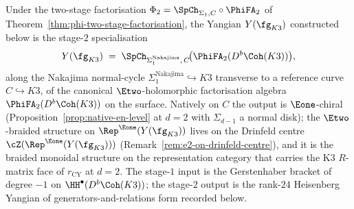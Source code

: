 \begin{remark}
\label{rem:k3y-stage-abelian-yangian}
Under the two-stage factorisation
$\Phi_2 = \SpCh_{\Sigma_1, C} \circ \PhiFA_2$ of
Theorem~\ref{thm:phi-two-stage-factorisation}, the Yangian
$Y(\fg_{K3})$ constructed below is the stage-$2$ specialisation
\[
 Y(\fg_{K3})
 \;=\;
 \SpCh_{\Sigma_1^{\mathrm{Nakajima}},\, C}\!\bigl(\PhiFA_2(D^b\Coh(K3))\bigr),
\]
along the Nakajima normal-cycle $\Sigma_1^{\mathrm{Nakajima}}
\hookrightarrow K3$ transverse to a reference curve
$C \hookrightarrow K3$, of the canonical $\Etwo$-holomorphic
factorisation algebra $\PhiFA_2(D^b\Coh(K3))$ on the surface.
Natively on $C$ the output is $\Eone$-chiral
(Proposition~\ref{prop:native-en-level} at $d = 2$ with $\Sigma_{d-1}$
a normal disk); the $\Etwo$-braided structure on
$\Rep^{\Eone}(Y(\fg_{K3}))$ lives on the Drinfeld centre
$\cZ(\Rep^{\Eone}(Y(\fg_{K3})))$
(Remark~\ref{rem:e2-on-drinfeld-centre}), and it is the braided
monoidal structure on the representation category that carries the
K3 $R$-matrix face of $r_{\mathrm{CY}}$ at $d = 2$. The stage-$1$
input is the Gerstenhaber bracket of degree $-1$ on
$\HH^\bullet(D^b\Coh(K3))$; the stage-$2$ output is the rank-$24$
Heisenberg Yangian of generators-and-relations form recorded below.
\end{remark}

